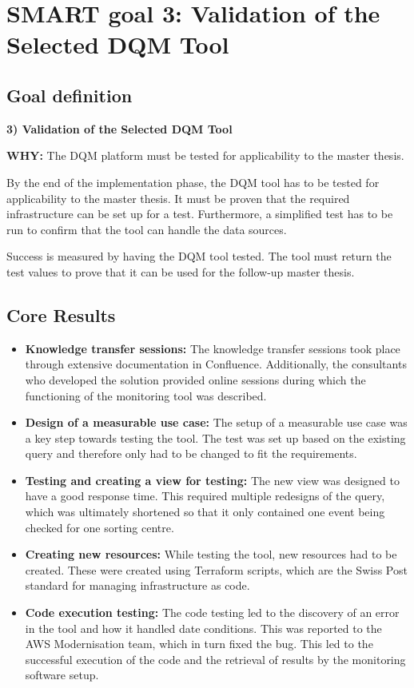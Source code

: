 \section{SMART goal 3: Validation of the Selected DQM Tool}
\subsection*{Goal definition}
\textbf{3) Validation of the Selected DQM Tool}
    
\textbf{WHY:} The DQM platform must be tested for applicability to the master thesis.

By the end of the implementation phase, the DQM tool has to be tested for applicability to the master thesis. It must be proven that the required infrastructure can be set up for a test. Furthermore, a simplified test has to be run to confirm that the tool can handle the data sources.

Success is measured by having the DQM tool tested. The tool must return the test values to prove that it can be used for the follow-up master thesis.



\subsection*{Core Results}

\begin{itemize}
    
\item \textbf{Knowledge transfer sessions:} The knowledge transfer sessions took place through extensive documentation in Confluence. Additionally, the consultants who developed the solution provided online sessions during which the functioning of the monitoring tool was described.

\item \textbf{Design of a measurable use case:} The setup of a measurable use case was a key step towards testing the tool. The test was set up based on the existing query and therefore only had to be changed to fit the requirements.

\item \textbf{Testing and creating a view for testing:} The new view was designed to have a good response time. This required multiple redesigns of the query, which was ultimately shortened so that it only contained one event being checked for one sorting centre.

\item \textbf{Creating new resources:} While testing the tool, new resources had to be created. These were created using Terraform scripts, which are the Swiss Post standard for managing infrastructure as code.

\item \textbf{Code execution testing:} The code testing led to the discovery of an error in the tool and how it handled date conditions. This was reported to the AWS Modernisation team, which in turn fixed the bug. This led to the successful execution of the code and the retrieval of results by the monitoring software setup.
\end{itemize}


